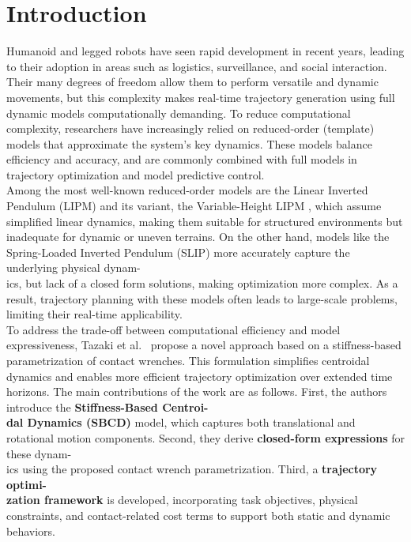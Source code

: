 \documentclass[main.tex]{subfiles}
\begin{document}
\section{Introduction}
\label{sec:introduction}
Humanoid and legged robots have seen rapid development in recent years, leading to their adoption in areas such as logistics, surveillance, and social interaction. Their many degrees of freedom allow them to perform versatile and dynamic movements, but this complexity makes real-time trajectory generation using full dynamic models computationally demanding. To reduce computational complexity, researchers have increasingly relied on reduced-order (template) models that approximate the system’s key dynamics. These models balance efficiency and accuracy, and are commonly combined with full models in trajectory optimization and model predictive control. \\
Among the most well-known reduced-order models are the Linear Inverted Pendulum (LIPM) \cite{kajita1991study} and its variant, the Variable-Height LIPM \cite{caron2020biped}, which assume simplified linear dynamics, making them suitable for structured environments but inadequate for dynamic or uneven terrains. On the other hand, models like the Spring-Loaded Inverted Pendulum (SLIP) \cite{poulakakis2009spring} more accurately capture the underlying physical dynam-\\ics, but lack of a closed form solutions, making optimization more complex. As a result, trajectory planning with these models often leads to large-scale problems, limiting their real-time applicability.\\
To address the trade-off between computational efficiency and model expressiveness, Tazaki et al.~\cite{tazaki2024trajectory} propose a novel approach based on a stiffness-based parametrization of contact wrenches. This formulation simplifies centroidal dynamics and enables more efficient trajectory optimization over extended time horizons. The main contributions of the work are as follows. First, the authors introduce the \textbf{Stiffness-Based Centroi-\\} \textbf{dal Dynamics (SBCD)} model, which captures both translational and rotational motion components. Second, they derive \textbf{closed-form expressions} for these dynam-\\ics using the proposed contact wrench parametrization. Third, a \textbf{trajectory optimi-\\} \textbf{zation framework} is developed, incorporating task objectives, physical constraints, and contact-related cost terms to support both static and dynamic behaviors.\\
\end{document}
